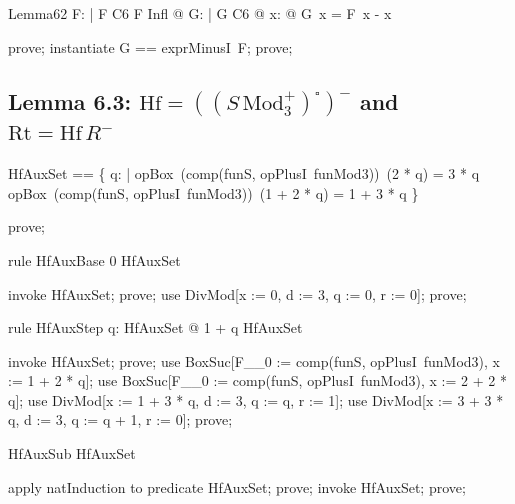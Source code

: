 \documentclass{article}
\begin{document}
\begin{theorem}{Lemma62}
  \forall F: \nat \fun \nat | F \in C6 \land F \in Infl @
    \exists G: \nat \fun \nat | G \in C6 @ \forall x: \nat @ G~x = F~x - x
\end{theorem}

\begin{zproof}
prove;
instantiate G == exprMinusI~F;
prove;
\end{zproof}

\subsection{Lemma 6.3: $\mathrm{Hf} = ((S\,\mathrm{Mod}_3^+)^\square)^-$ and $\mathrm{Rt} = \mathrm{Hf}\,R^-$}

\begin{zed}
  HfAuxSet == \{ q: \nat | opBox~(comp(funS, opPlusI~funMod3))~(2 * q) = 3 * q \land opBox~(comp(funS, opPlusI~funMod3))~(1 + 2 * q) = 1 + 3 * q \}
\end{zed}

\begin{zproof}
prove;
\end{zproof}

\begin{theorem}{rule HfAuxBase}
  0 \in HfAuxSet
\end{theorem}

\begin{zproof}
invoke HfAuxSet;
prove;
use DivMod[x := 0, d := 3, q := 0, r := 0];
prove;
\end{zproof}

\begin{theorem}{rule HfAuxStep}
  \forall q: HfAuxSet @ 1 + q \in HfAuxSet
\end{theorem}

\begin{zproof}
invoke HfAuxSet;
prove;
use BoxSuc[F\_\_0 := comp(funS, opPlusI~funMod3), x := 1 + 2 * q];
use BoxSuc[F\_\_0 := comp(funS, opPlusI~funMod3), x := 2 + 2 * q];
use DivMod[x := 1 + 3 * q, d := 3, q := q, r := 1];
use DivMod[x := 3 + 3 * q, d := 3, q := q + 1, r := 0];
prove;
\end{zproof}

\begin{theorem}{HfAuxSub}
  \nat \subseteq HfAuxSet
\end{theorem}

\begin{zproof}
apply natInduction to predicate \nat \subseteq HfAuxSet;
prove;
invoke HfAuxSet;
prove;
\end{zproof}
\end{document}
